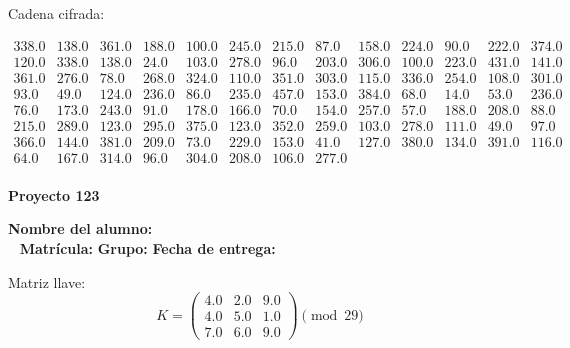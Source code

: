 \documentclass[12pt]{article}
\begin{document}
Cadena cifrada:
\begin{center}
$\begin{array}{lllllllllllll}
338.0 & 138.0 & 361.0 & 188.0 & 100.0 & 245.0 & 215.0 & 87.0 & 158.0 & 224.0 & 90.0 & 222.0 & 374.0\\
120.0 & 338.0 & 138.0 & 24.0 & 103.0 & 278.0 & 96.0 & 203.0 & 306.0 & 100.0 & 223.0 & 431.0 & 141.0\\
361.0 & 276.0 & 78.0 & 268.0 & 324.0 & 110.0 & 351.0 & 303.0 & 115.0 & 336.0 & 254.0 & 108.0 & 301.0\\
93.0 & 49.0 & 124.0 & 236.0 & 86.0 & 235.0 & 457.0 & 153.0 & 384.0 & 68.0 & 14.0 & 53.0 & 236.0\\
76.0 & 173.0 & 243.0 & 91.0 & 178.0 & 166.0 & 70.0 & 154.0 & 257.0 & 57.0 & 188.0 & 208.0 & 88.0\\
215.0 & 289.0 & 123.0 & 295.0 & 375.0 & 123.0 & 352.0 & 259.0 & 103.0 & 278.0 & 111.0 & 49.0 & 97.0\\
366.0 & 144.0 & 381.0 & 209.0 & 73.0 & 229.0 & 153.0 & 41.0 & 127.0 & 380.0 & 134.0 & 391.0 & 116.0\\
64.0 & 167.0 & 314.0 & 96.0 & 304.0 & 208.0 & 106.0 & 277.0\\
\end{array}$
\end{center}

\newpage


\textbf{Proyecto 123}

\textbf{Nombre del alumno:} \underline{\hspace{13cm}}\\\
\vspace{1cm}
\textbf{Matrícula:} \underline{\hspace{4cm}} \hspace{1cm}
\textbf{Grupo:} \underline{\hspace{2cm}}
\textbf{Fecha de entrega:} \underline{\hspace{2cm}}

\medskip

Matriz llave:
\[
K = \begin{pmatrix}
4.0 & 2.0 & 9.0\\
4.0 & 5.0 & 1.0\\
7.0 & 6.0 & 9.0
\end{pmatrix} \pmod{29}
\]
\end{document}
